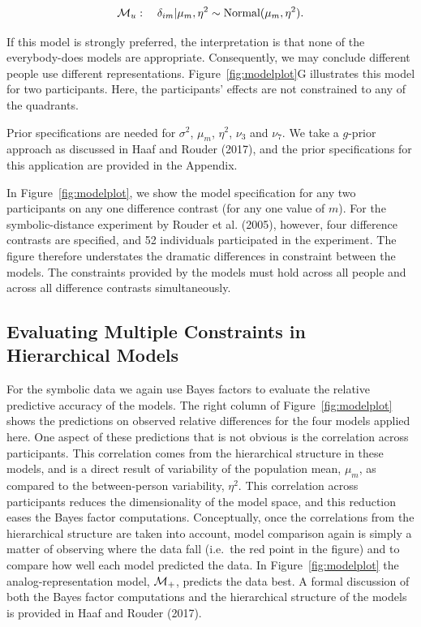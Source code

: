 \documentclass[english,,man]{apa6}
\begin{document}
\[
{\cal M}_u: \quad \delta_{im}|\mu_m,\eta^2 \sim \mbox{Normal}(\mu_m,\eta^2).
\]

If this model is strongly preferred, the interpretation is that none of the everybody-does models are appropriate. Consequently, we may conclude different people use different representations. Figure~\ref{fig:modelplot}G illustrates this model for two participants. Here, the participants' effects are not constrained to any of the quadrants.

Prior specifications are needed for \(\sigma^2\), \(\mu_m\), \(\eta^2\), \(\nu_3\) and \(\nu_7\). We take a \(g\)-prior approach as discussed in Haaf and Rouder (2017), and the prior specifications for this application are provided in the Appendix.

In Figure~\ref{fig:modelplot}, we show the model specification for any two participants on any one difference contrast (for any one value of \(m\)). For the symbolic-distance experiment by Rouder et al. (2005), however, four difference contrasts are specified, and 52 individuals participated in the experiment. The figure therefore understates the dramatic differences in constraint between the models. The constraints provided by the models must hold across all people and across all difference contrasts simultaneously.

\hypertarget{evaluating-multiple-constraints-in-hierarchical-models}{%
\subsection{Evaluating Multiple Constraints in Hierarchical Models}\label{evaluating-multiple-constraints-in-hierarchical-models}}

For the symbolic data we again use Bayes factors to evaluate the relative predictive accuracy of the models. The right column of Figure~\ref{fig:modelplot} shows the predictions on observed relative differences for the four models applied here. One aspect of these predictions that is not obvious is the correlation across participants. This correlation comes from the hierarchical structure in these models, and is a direct result of variability of the population mean, \(\mu_m\), as compared to the between-person variability, \(\eta^2\). This correlation across participants reduces the dimensionality of the model space, and this reduction eases the Bayes factor computations. Conceptually, once the correlations from the hierarchical structure are taken into account, model comparison again is simply a matter of observing where the data fall (i.e.~the red point in the figure) and to compare how well each model predicted the data. In Figure~\ref{fig:modelplot} the analog-representation model, \({\cal M}_+\), predicts the data best. A formal discussion of both the Bayes factor computations and the hierarchical structure of the models is provided in Haaf and Rouder (2017).
\end{document}
